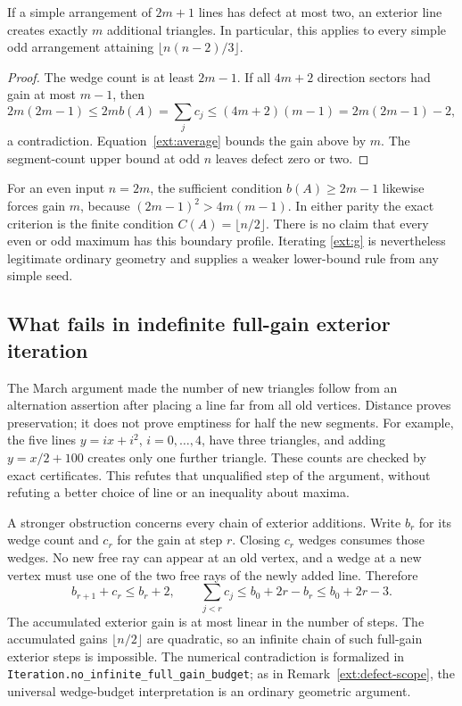 \begin{corollary}
\label{ext:odd-full}
If a simple arrangement of $2m+1$ lines has defect at most two, an exterior
line creates exactly $m$ additional triangles.  In particular, this
applies to every simple odd arrangement attaining
$\lfloor n(n-2)/3\rfloor$.
\end{corollary}

\begin{proof}
The wedge count is at least $2m-1$.  If all $4m+2$ direction sectors had
gain at most $m-1$, then
\[
 2m(2m-1)\leq 2m b(A)=\sum_jc_j
 \leq(4m+2)(m-1)=2m(2m-1)-2,
\]
a contradiction.  Equation~\eqref{ext:average} bounds the gain above by
$m$.  The segment-count upper bound at odd $n$ leaves defect zero or two.
\end{proof}

For an even input $n=2m$, the sufficient condition $b(A)\geq2m-1$ likewise
forces gain $m$, because $(2m-1)^2>4m(m-1)$.  In either parity the exact
criterion is the finite condition $C(A)=\lfloor n/2\rfloor$.
There is no claim that every even or odd maximum has this boundary
profile.  Iterating \eqref{ext:g} is nevertheless legitimate ordinary
geometry and supplies a weaker lower-bound rule from any simple seed.

\subsection{What fails in indefinite full-gain exterior iteration}

The March argument made the number of new triangles follow from an
alternation assertion after placing a line far from all old vertices.
Distance proves preservation; it does not prove emptiness for half the
new segments.  For example, the five lines $y=ix+i^2$, $i=0,\ldots,4$,
have three triangles, and adding $y=x/2+100$ creates only one further
triangle.  These counts are checked by exact certificates.  This refutes
that unqualified step of the argument, without refuting a better choice
of line or an inequality about maxima.

A stronger obstruction concerns every chain of exterior additions.
Write $b_r$ for its wedge count and $c_r$ for the gain at step $r$.
Closing $c_r$ wedges consumes those wedges.  No new free ray can appear
at an old vertex, and a wedge at a new vertex must use one of the two
free rays of the newly added line.  Therefore
\begin{equation}
 b_{r+1}+c_r\leq b_r+2,
 \qquad
 \sum_{j<r}c_j\leq b_0+2r-b_r\leq b_0+2r-3.
 \label{ext:budget}
\end{equation}
The accumulated exterior gain is at most linear in the number of steps.
The accumulated gains $\lfloor n/2\rfloor$ are quadratic, so an infinite
chain of such full-gain exterior steps is impossible.  The numerical
contradiction is formalized in
\texttt{Iteration.no\_infinite\_full\_gain\_budget}; as in
Remark~\ref{ext:defect-scope}, the universal wedge-budget interpretation
is an ordinary geometric argument.

